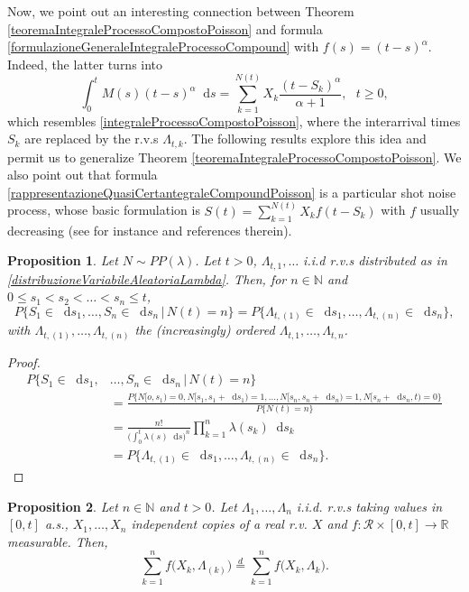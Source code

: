 \documentclass[12pt, twoside, english, headsepline]{article}
\newcommand*\dif{\mathop{}\!\mathrm{d}}  %
\newtheorem{proposition}{Proposition}[section] %
\theoremstyle{definition} %
\numberwithin{equation}{section} %
\begin{document}
Now, we point out an interesting connection between Theorem \ref{teoremaIntegraleProcessoCompostoPoisson} and formula \eqref{formulazioneGeneraleIntegraleProcessoCompound} with $f(s) = (t-s)^\alpha$. Indeed, the latter turns into
\begin{equation}\label{rappresentazioneQuasiCertantegraleCompoundPoisson}
	\int_0^t M(s)(t-s)^{\alpha}\dif s = \sum_{k=1}^{N(t)} X_k \frac{(t-S_k)^\alpha}{\alpha+1},\ \ \ t\ge0,
\end{equation} 
which resembles \eqref{integraleProcessoCompostoPoisson}, where the interarrival times $S_k$ are replaced by the r.v.s $\Lambda_{t,k}$. The following results explore this idea and permit us to generalize Theorem \ref{teoremaIntegraleProcessoCompostoPoisson}. We also point out that formula \eqref{rappresentazioneQuasiCertantegraleCompoundPoisson} is a particular shot noise process, whose basic formulation is $S(t) = \sum_{k=1}^{N(t)} X_k f(t-S_k)$ with $f$ usually decreasing (see for instance \cite{BCS2026} and references therein).

\begin{proposition}\label{proposizioneDistribuzioneCongiuntaIntertempiPoisson}
	Let $N\sim PP(\lambda)$. Let $t>0$, $\Lambda_{t,1},\dots$ i.i.d r.v.s distributed as in \eqref{distribuzioneVariabileAleatoriaLambda}. Then, for $n\in\mathbb{N}$ and $0\le s_1<s_2<\dots<s_n\le t$,
	\begin{equation}
		P\{S_1\in\dif s_1,\dots,S_n\in \dif s_n\,|\,N(t) = n\} = P\{\Lambda_{t,(1)}\in\dif s_1, \dots, \Lambda_{t, (n)}\in\dif s_n\},
	\end{equation}
	with $\Lambda_{t,(1)},\dots,\Lambda_{t,(n)}$ the (increasingly) ordered $\Lambda_{t,1},\dots,\Lambda_{t,n}$.
\end{proposition}

\begin{proof}
	\begin{align*}
		P\{S_1\in \dif s_1,&\dots,S_n\in \dif s_n\,|\,N(t) = n\} \\
		&= \frac{P\{N[o,s_1) = 0,N[s_1,s_1+\dif s_1) = 1,\dots, N[s_n,s_n+\dif s_n) = 1,N[s_n+\dif s_n,t) = 0\}}{P\{N(t) = n\}} \\
		&= \frac{n!}{\big(\int_0^t\lambda(s)\dif s\big)^n} \prod_{k=1}^n\lambda(s_k)\dif s_k \\
		&= 	P\{\Lambda_{t,(1)}\in\dif s_1, \dots, \Lambda_{t, (n)}\in\dif s_n\}.
	\end{align*}
\end{proof}

\begin{proposition}\label{proposizioneVariabiliOrdinateFunzioniCommutative}
	Let $n\in\mathbb{N}$ and $t>0$. Let $\Lambda_1,\dots,\Lambda_n$ i.i.d. r.v.s taking values in $[0,t]$ a.s., $X_1,\dots,X_n$ independent copies of a real r.v. $X$ and $f:\mathcal{R}\times [0,t] \longrightarrow \mathbb{R}$ measurable. Then,
	\begin{equation}
		\sum_{k=1}^n f\Big(X_k, \Lambda_{(k)}\Big) \stackrel{d}{=} \sum_{k=1}^n f\big( X_k,\Lambda_k \big).
	\end{equation}
\end{proposition}
\end{document}
